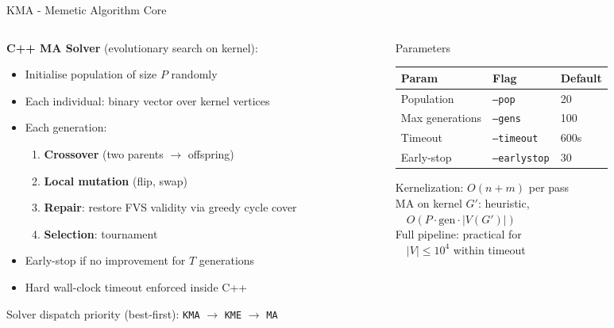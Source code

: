 \documentclass[aspectratio=169]{beamer}
\renewcommand{\footnotesize}{\tiny}
\begin{document}
\begin{frame}{KMA - Memetic Algorithm Core}
	\begin{columns}[T]
		\begin{column}{0.50\textwidth}
			\textbf{C++ MA Solver} (evolutionary search on kernel):
			\begin{itemize}\setlength\itemsep{2pt}
				\item Initialise population of size $P$ randomly
				\item Each individual: binary vector over kernel vertices
				\item Each generation:
				      \begin{enumerate}\setlength\itemsep{1pt}
					      \item \textbf{Crossover} (two parents $\to$ offspring)
					      \item \textbf{Local mutation} (flip, swap)
					      \item \textbf{Repair}: restore FVS validity via greedy cycle cover
					      \item \textbf{Selection}: tournament
				      \end{enumerate}
				\item Early-stop if no improvement for $T$ generations
				\item Hard wall-clock timeout enforced inside C++
			\end{itemize}
			\vspace{4pt}
			Solver dispatch priority (best-first):
			\texttt{KMA} $\to$ \texttt{KME} $\to$ \texttt{MA}
		\end{column}
		\begin{column}{0.50\textwidth}
			\begin{block}{Parameters}
				\begin{tabular}{lll}
					\toprule
					Param           & Flag                 & Default \\
					\midrule
					Population      & \texttt{--pop}       & 20      \\
					Max generations & \texttt{--gens}      & 100     \\
					Timeout         & \texttt{--timeout}   & 600s    \\
					Early-stop      & \texttt{--earlystop} & 30      \\
					\bottomrule
				\end{tabular}
			\end{block}
			\vspace{6pt}
			\begin{tcolorbox}[algbox,title=Complexity Note]
				\footnotesize
				Kernelization: $O(n+m)$ per pass\\
				MA on kernel $G'$: heuristic,\\
				~~$O(P \cdot \text{gen} \cdot |V(G')|)$\\
				Full pipeline: practical for\\
				~~$|V| \le 10^4$ within timeout
			\end{tcolorbox}
		\end{column}
	\end{columns}
\end{frame}
\end{document}
